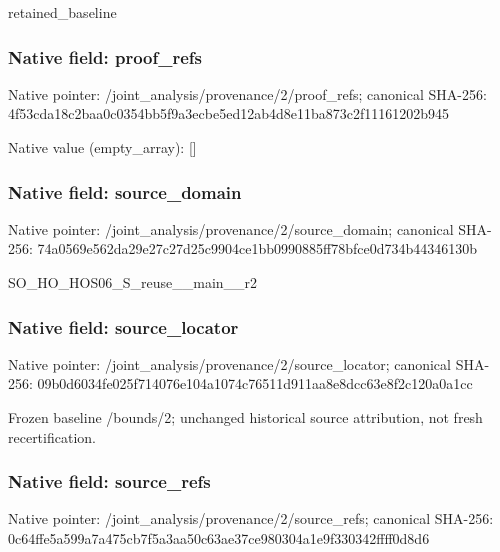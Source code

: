 \documentclass[10pt,a4paper]{article}
\begin{document}
\begingroup\raggedright\sloppy retained\_\allowbreak{}baseline\par\endgroup

\subsubsection{Native field: proof\_\allowbreak{}refs}
Native pointer: /joint\_\allowbreak{}analysis/provenance/2/proof\_\allowbreak{}refs; canonical SHA-256: 4f53cda18c2baa0c0354bb5f9a3ecbe5ed12ab4d8e11ba873c2f11161202b945

Native value (empty\_\allowbreak{}array): []

\subsubsection{Native field: source\_\allowbreak{}domain}
Native pointer: /joint\_\allowbreak{}analysis/provenance/2/source\_\allowbreak{}domain; canonical SHA-256: 74a0569e562da29e27c27d25c9904ce1bb0990885ff78bfce0d734b44346130b

\begingroup\raggedright\sloppy SO\_\allowbreak{}HO\_\allowbreak{}HOS06\_\allowbreak{}S\_\allowbreak{}reuse\_\allowbreak{}\_\allowbreak{}main\_\allowbreak{}\_\allowbreak{}r2\par\endgroup

\subsubsection{Native field: source\_\allowbreak{}locator}
Native pointer: /joint\_\allowbreak{}analysis/provenance/2/source\_\allowbreak{}locator; canonical SHA-256: 09b0d6034fe025f714076e104a1074c76511d911aa8e8dcc63e8f2c120a0a1cc

\begingroup\raggedright\sloppy Frozen baseline /\allowbreak{}bounds/\allowbreak{}2;\allowbreak{} unchanged historical source attribution,\allowbreak{} not fresh recertification.\par\endgroup

\subsubsection{Native field: source\_\allowbreak{}refs}
Native pointer: /joint\_\allowbreak{}analysis/provenance/2/source\_\allowbreak{}refs; canonical SHA-256: 0c64ffe5a599a7a475cb7f5a3aa50c63ae37ce980304a1e9f330342ffff0d8d6
\end{document}
